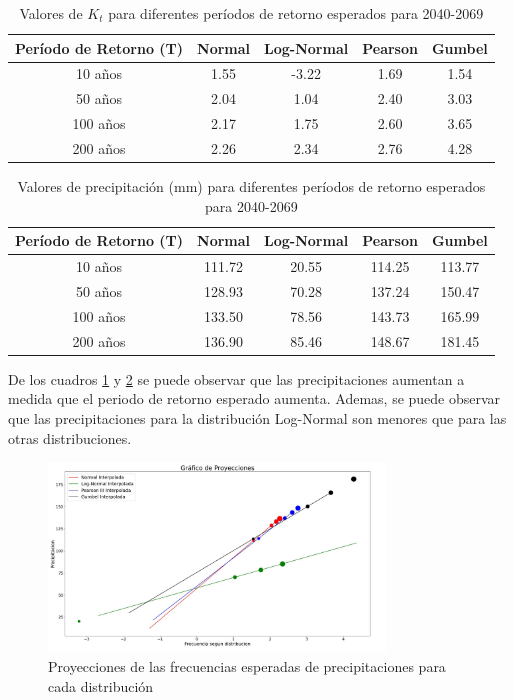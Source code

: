 \documentclass{article}  %
\begin{document}
\begin{table}[H]
  \centering
  \caption{Valores de \( K_t \) para diferentes períodos de retorno esperados para 2040-2069}
  \begin{tabular}{|c|c|c|c|c|}
  \hline
  \textbf{Período de Retorno (T)} & \textbf{Normal} & \textbf{Log-Normal} & \textbf{Pearson} & \textbf{Gumbel} \\ \hline
  10 años  & 1.55 & -3.22 & 1.69 & 1.54 \\ \hline
  50 años  & 2.04 & 1.04  & 2.40 & 3.03 \\ \hline
  100 años & 2.17 & 1.75  & 2.60 & 3.65 \\ \hline
  200 años & 2.26 & 2.34  & 2.76 & 4.28 \\ \hline
  \end{tabular}
  \label{table:kt_b}
\end{table}

\begin{table}[H]
  \centering
  \caption{Valores de precipitación (mm) para diferentes períodos de retorno esperados para 2040-2069}
  \begin{tabular}{|c|c|c|c|c|}
  \hline
  \textbf{Período de Retorno (T)} & \textbf{Normal} & \textbf{Log-Normal} & \textbf{Pearson} & \textbf{Gumbel} \\ \hline
  10 años  & 111.72 & 20.55 & 114.25 & 113.77 \\ \hline
  50 años  & 128.93 & 70.28 & 137.24 & 150.47 \\ \hline
  100 años & 133.50 & 78.56 & 143.73 & 165.99 \\ \hline
  200 años & 136.90 & 85.46 & 148.67 & 181.45 \\ \hline
  \end{tabular}
  \label{table:precipitacion_b}
\end{table}

De los cuadros \ref{table:kt_b} y \ref{table:precipitacion_b} se puede observar que las precipitaciones aumentan a medida que el periodo de retorno esperado aumenta. Ademas, se puede observar que las precipitaciones para la distribución Log-Normal son menores que para las otras distribuciones.

\begin{figure}[H]
  \centering
  \includegraphics[width=0.8\textwidth]{grafico_b_proyecciones.jpg}
  \caption{Proyecciones de las frecuencias esperadas de precipitaciones para cada distribución}
  \label{fig:grafico_b_preyecciones}
\end{figure}
\end{document}

